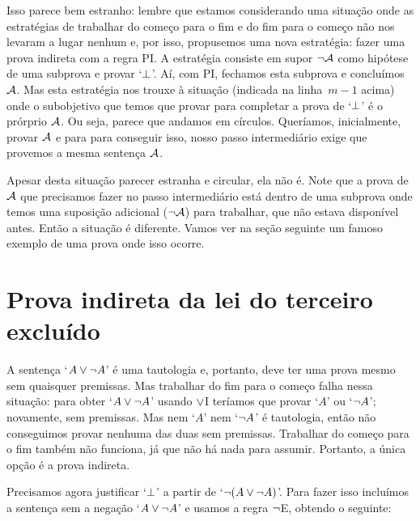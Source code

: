 Isso parece bem estranho: lembre que estamos considerando uma situação onde as estratégias de trabalhar do começo para o fim e do fim para o começo não nos levaram a lugar nenhum e, por isso, propusemos uma nova estratégia: fazer uma prova indireta com a regra PI. A estratégia consiste em supor $\neg \mathcal{A}$ como hipótese de uma subprova e provar `$\bot$'. Aí, com PI, fechamos esta subprova e concluímos $\mathcal{A}$. Mas esta estratégia nos trouxe à situação (indicada na linha~$m - 1$ acima) onde o subobjetivo que temos que provar para completar a prova de `$\bot$' é o prórprio $\mathcal{A}$. Ou seja, parece que andamos em círculos. Queríamos, inicialmente, provar $\mathcal{A}$ e para para conseguir isso, nosso passo intermediário exige que provemos a mesma sentença $\mathcal{A}$.

Apesar desta situação parecer estranha e circular, ela não é. Note que a prova de $\mathcal{A}$ que precisamos fazer no passo intermediário está dentro de uma subprova onde temos uma suposição adicional ($\neg \mathcal{A}$) para trabalhar, que não estava disponível antes. Então a situação é diferente. Vamos ver na seção seguinte um famoso exemplo de uma prova onde isso ocorre.

 


\section{Prova indireta da lei do terceiro excluído}\label{s:proofLEM}

A sentença `$A \vee \neg A$' é uma tautologia e, portanto, deve ter uma prova mesmo sem quaisquer premissas. Mas trabalhar do fim para o começo falha nessa situação: para obter `$A \vee \neg A$' usando $\vee$I teríamos que provar `$A$' ou `$\neg A$'; novamente, sem premissas. Mas nem `$A$' nem  `$\neg A$' é tautologia, então não conseguimos provar nenhuma das duas sem premissas. Trabalhar  do começo para o fim também não funciona, já que não há nada para assumir. Portanto, a única opção é a prova indireta.
\begin{fitchproof}
	\open
	\ellipsesline
	\close
\end{fitchproof}

Precisamos agora justificar `$\bot$' a partir de `$\neg(A \vee \neg A)$'. Para fazer isso incluímos a sentença sem a negação   `$A \vee\neg A$' e usamos a regra  $\neg$E, obtendo o seguinte:
\begin{fitchproof}
	\open
	\ellipsesline
	\close
\end{fitchproof}

